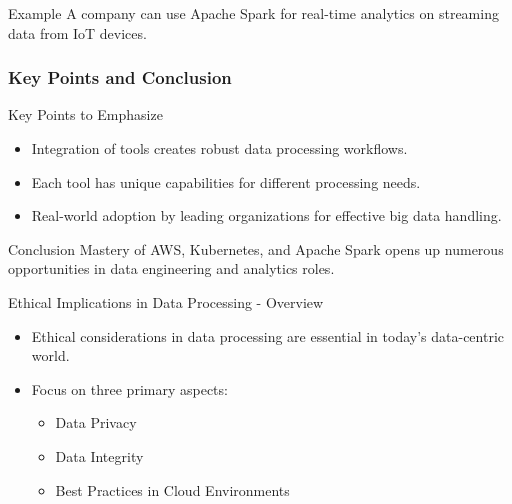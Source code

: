 \documentclass[aspectratio=169]{beamer}
\begin{document}
\begin{frame}[fragile]
    \begin{block}{Example}
        A company can use Apache Spark for real-time analytics on streaming data from IoT devices.
    \end{block}
\end{frame}

\begin{frame}[fragile]
    \frametitle{Key Points and Conclusion}
    \begin{block}{Key Points to Emphasize}
        \begin{itemize}
            \item Integration of tools creates robust data processing workflows.
            \item Each tool has unique capabilities for different processing needs.
            \item Real-world adoption by leading organizations for effective big data handling.
        \end{itemize}
    \end{block}

    \begin{block}{Conclusion}
        Mastery of AWS, Kubernetes, and Apache Spark opens up numerous opportunities in data engineering and analytics roles.
    \end{block}
\end{frame}

\begin{frame}[fragile]{Ethical Implications in Data Processing - Overview}
    \begin{itemize}
        \item Ethical considerations in data processing are essential in today's data-centric world.
        \item Focus on three primary aspects:
        \begin{itemize}
            \item Data Privacy
            \item Data Integrity
            \item Best Practices in Cloud Environments
        \end{itemize}
    \end{itemize}
\end{frame}
\end{document}
